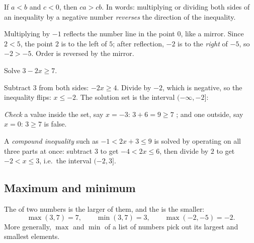 \begin{theorem}
\label{thm:flip-inequality}
If $a < b$ and $c < 0$, then $ca > cb$. In words: multiplying or dividing both
sides of an inequality by a negative number \emph{reverses} the direction of
the inequality.
\end{theorem}

\begin{intuition}
Multiplying by $-1$ reflects the number line in the point $0$, like a mirror.
Since $2 < 5$, the point $2$ is to the left of $5$; after reflection, $-2$ is to
the \emph{right} of $-5$, so $-2 > -5$. Order is reversed by the mirror.
\end{intuition}

\begin{example}\label{ex:inequality}
Solve $3 - 2x \ge 7$.

\sol Subtract $3$ from both sides: $-2x \ge 4$. Divide by $-2$, which is
negative, so the inequality flips: $x \le -2$. The solution set is the
interval $(-\infty, -2]$:
\begin{center}
\end{center}
\emph{Check} a value inside the set, say $x = -3$: $3 + 6 = 9 \ge 7$
\checkmark; and one outside, say $x = 0$: $3 \ge 7$ is false. \checkmark
\end{example}

A \emph{compound inequality} such as $-1 < 2x + 3 \le 9$ is solved by
operating on all three parts at once: subtract $3$ to get $-4 < 2x \le 6$, then
divide by $2$ to get $-2 < x \le 3$, i.e.\ the interval $(-2, 3]$.

\subsection{Maximum and minimum}

The  of two numbers is the larger of them, and the
 is the smaller:
\[
  \max(3, 7) = 7, \qquad \min(3, 7) = 3, \qquad \max(-2, -5) = -2 .
\]
More generally, $\max$ and $\min$ of a list of numbers pick out its largest
and smallest elements.

